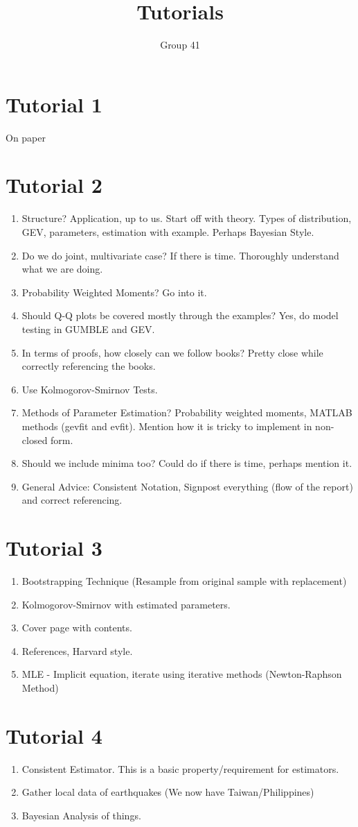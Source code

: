 \documentclass[12pt, letterpaper]{article}
\title{Tutorials}
\author{Group 41}
\begin{document}
\maketitle

\section{Tutorial 1}

On paper

\section{Tutorial 2}

\begin{enumerate}
    \item Structure? Application, up to us. Start off with theory.  Types of distribution, GEV, parameters, estimation with example. Perhaps Bayesian Style.
    \item Do we do joint, multivariate case? If there is time. Thoroughly understand what we are doing.
    \item Probability Weighted Moments? Go into it.
    \item Should Q-Q plots be covered mostly through the examples? Yes, do model testing in GUMBLE and GEV.
    \item In terms of proofs, how closely can we follow books? Pretty close while correctly referencing the books.
    \item Use Kolmogorov-Smirnov Tests.
    \item Methods of Parameter Estimation? Probability weighted moments, MATLAB methods (gevfit and evfit). Mention how it is tricky to implement in non-closed form.
    \item Should we include minima too? Could do if there is time, perhaps mention it.
    \item General Advice: Consistent Notation, Signpost everything (flow of the report) and correct referencing.
\end{enumerate}

\section{Tutorial 3}

\begin{enumerate}
    \item Bootstrapping Technique (Resample from original sample with replacement)
    \item Kolmogorov-Smirnov with estimated parameters.
    \item Cover page with contents.
    \item References, Harvard style.
    \item MLE - Implicit equation, iterate using iterative methods (Newton-Raphson Method)
\end{enumerate}

\section{Tutorial 4}

\begin{enumerate}
    \item Consistent Estimator. This is a basic property/requirement for estimators.
    \item Gather local data of earthquakes (We now have Taiwan/Philippines)
    \item Bayesian Analysis of things.
\end{enumerate}
\end{document}

